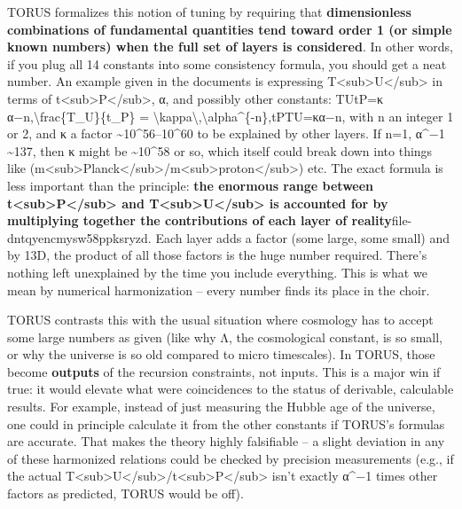 \documentclass[
]{article}
\begin{document}
TORUS formalizes this notion of tuning by requiring that
\textbf{dimensionless combinations of fundamental quantities tend toward
order 1 (or simple known numbers) when the full set of layers is
considered}\hspace{0pt}. In other words, if you plug all 14 constants
into some consistency formula, you should get a neat number. An example
given in the documents is expressing
T\textless sub\textgreater U\textless/sub\textgreater{} in terms of
t\textless sub\textgreater P\textless/sub\textgreater, α, and possibly
other constants: TUtP=κ α−n,\textbackslash frac\{T\_U\}\{t\_P\} =
\textbackslash kappa\textbackslash,\textbackslash alpha\^{}\{-n\},tP\hspace{0pt}TU\hspace{0pt}\hspace{0pt}=κα−n,
with n an integer 1 or 2, and κ a factor
\textasciitilde10\^{}56--10\^{}60 to be explained by other
layers\hspace{0pt}. If n=1, α\^{}−1 \textasciitilde137, then κ might be
\textasciitilde10\^{}58 or so, which itself could break down into things
like
(m\textless sub\textgreater Planck\textless/sub\textgreater/m\textless sub\textgreater proton\textless/sub\textgreater)
etc. The exact formula is less important than the principle: \textbf{the
enormous range between
t\textless sub\textgreater P\textless/sub\textgreater{} and
T\textless sub\textgreater U\textless/sub\textgreater{} is accounted for
by multiplying together the contributions of each layer of
reality}\hspace{0pt}file-dntqyencmysw58ppksryzd. Each layer adds a
factor (some large, some small) and by 13D, the product of all those
factors is the huge number required. There's nothing left unexplained by
the time you include everything. This is what we mean by numerical
harmonization -- every number finds its place in the choir.

TORUS contrasts this with the usual situation where cosmology has to
accept some large numbers as given (like why Λ, the cosmological
constant, is so small, or why the universe is so old compared to micro
timescales). In TORUS, those become \textbf{outputs} of the recursion
constraints, not inputs\hspace{0pt}. This is a major win if true: it
would elevate what were coincidences to the status of derivable,
calculable results\hspace{0pt}. For example, instead of just measuring
the Hubble age of the universe, one could in principle calculate it from
the other constants if TORUS's formulas are accurate. That makes the
theory highly falsifiable -- a slight deviation in any of these
harmonized relations could be checked by precision measurements (e.g.,
if the actual
T\textless sub\textgreater U\textless/sub\textgreater/t\textless sub\textgreater P\textless/sub\textgreater{}
isn't exactly α\^{}−1 times other factors as predicted, TORUS would be
off).
\end{document}
